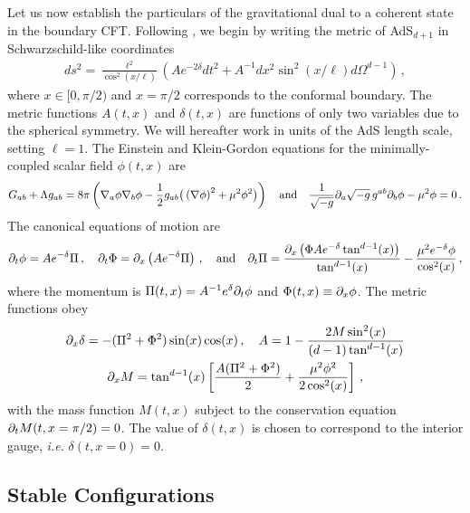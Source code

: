\documentclass[../PhD.tex]{subfiles}
\begin{document}
Let us now establish the particulars of the gravitational dual to a coherent state in the boundary CFT. Following \cite{1508.02709}, we begin by writing the metric of AdS$_{d+1}$ in Schwarzschild-like coordinates 
\begin{align}
ds^2 = \frac{\ell^2}{\cos^2 \left(x / \ell \right)} \left( A e^{-2\delta} dt^2 + A^{-1}dx^2 \sin^2 \left(x / \ell \right) d\Omega^{d-1} \right) \, ,
\end{align}
where $x \in [0, \pi/2)$ and $x = \pi / 2$ corresponds to the conformal boundary. The metric functions $A(t,x)$ and $\delta(t,x)$ are functions of only two variables due to the spherical symmetry. We will hereafter work in units of the AdS length scale, setting $\ell = 1$. The Einstein and Klein-Gordon equations for the minimally-coupled scalar field $\phi(t,x)$ are
\begin{align}
G_{ab} + \Lambda g_{ab} = 8\pi \left( \nabla_a \phi \nabla_b \phi - \frac{1}{2} g_{ab} \big( \left( \nabla \phi \right)^2 + \mu^2 \phi^2 \big) \right) \quad \text{and} \quad \frac{1}{\sqrt{-g}} \partial_a \sqrt{-g} \, g^{ab} \partial_b \phi - \mu^2 \phi = 0 \, .
\end{align}
The canonical equations of motion are \cite{1210.1566}
\begin{align}
\label{canon eqns}
\partial_t \phi = A e^{-\delta} \Pi \, , \quad \partial_t \Phi = \partial_x \left( A e^{-\delta} \Pi \right) \, , \quad \text{and} \quad \partial_t \Pi = \frac{\partial_x \left( \Phi A e^{-\delta} \tan^{d-1} (x) \right)}{\tan^{d-1}(x)} - \frac{\mu^2 e^{-\delta} \phi}{\cos^2 (x)} \, ,
\end{align}
where the momentum is $\Pi(t,x) = A^{-1} e^{\delta} \partial_t \phi$ and $\Phi(t,x) \equiv \partial_x \phi$. The metric functions obey
\begin{align}
\label{metric funcs}
\begin{gathered}
\partial_x \delta = - (\Pi^2 + \Phi^2 ) \sin (x) \cos(x) \, , \quad A = 1 - \frac{2M \sin^2 (x) }{(d-1) \tan^{d-1}(x)} \\
\partial_x M = \tan^{d-1}(x) \left[ \frac{A (\Pi^2 + \Phi^2)}{2} + \frac{\mu^2 \phi^2}{2 \cos^2 (x)} \right] \, ,
\end{gathered}
\end{align}
with the mass function $M(t,x)$ subject to the conservation equation $\partial_t M( t, x = \pi/2) = 0$. The value of $\delta(t,x)$ is chosen to correspond to the interior gauge, {\it i.e.} $\delta(t,x=0) = 0$. 

\subsection{Stable Configurations}
\end{document}

